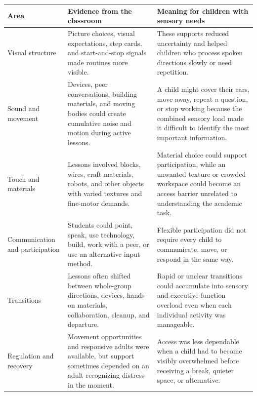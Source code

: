 \documentclass[11pt]{article}
\newcommand{\reviewsection}[1]{\vspace{0.07in}\noindent{\normalsize\bfseries\color{PrimaryRed}#1}\par\vspace{0.02in}}
\begin{document}
\renewcommand{\arraystretch}{1.22}
\setlength{\tabcolsep}{5pt}
\begin{tabular}{>{\RaggedRight\arraybackslash}p{1.05in} >{\RaggedRight\arraybackslash}p{2.45in} >{\RaggedRight\arraybackslash}p{3.15in}}
\toprule
\rowcolor{SoftBlue}
\textbf{Area} & \textbf{Evidence from the classroom} & \textbf{Meaning for children with sensory needs} \\
\midrule
Visual structure & Picture choices, visual expectations, step cards, and start-and-stop signals made routines more visible. & These supports reduced uncertainty and helped children who process spoken directions slowly or need repetition. \\
Sound and movement & Devices, peer conversations, building materials, and moving bodies could create cumulative noise and motion during active lessons. & A child might cover their ears, move away, repeat a question, or stop working because the combined sensory load made it difficult to identify the most important information. \\
Touch and materials & Lessons involved blocks, wires, craft materials, robots, and other objects with varied textures and fine-motor demands. & Material choice could support participation, while an unwanted texture or crowded workspace could become an access barrier unrelated to understanding the academic task. \\
Communication and participation & Students could point, speak, use technology, build, work with a peer, or use an alternative input method. & Flexible participation did not require every child to communicate, move, or respond in the same way. \\
Transitions & Lessons often shifted between whole-group directions, devices, hands-on materials, collaboration, cleanup, and departure. & Rapid or unclear transitions could accumulate into sensory and executive-function overload even when each individual activity was manageable. \\
Regulation and recovery & Movement opportunities and responsive adults were available, but support sometimes depended on an adult recognizing distress in the moment. & Access was less dependable when a child had to become visibly overwhelmed before receiving a break, quieter space, or alternative. \\
\bottomrule
\end{tabular}

\reviewsection{Overall Assessment}
\end{document}

